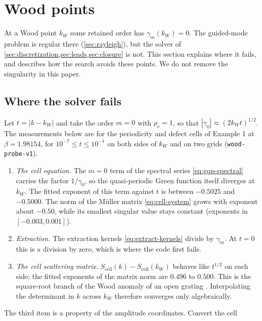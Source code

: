 \section{Wood points}\label{sec:wood}
At a Wood point $k_W$ some retained order has $\gamma_m(k_W)=0$. The
guided-mode problem is regular there (\cref{sec:rayleigh}), but the solver of
\cref{sec:discretization,sec:leads,sec:closure} is not. This section
explains where it fails, and describes how the search avoids these points.
We do not remove the singularity in this paper.

\subsection{Where the solver fails}\label{sec:wood-mechanism}
Let $t=|k-k_W|$ and take the order $m=0$ with $\rho_{\mathrm e}=1$, so that
$|\gamma_0|\approx(2k_Wt)^{1/2}$. The measurements below are for the periodicity
and defect cells of Example 1 at $\beta=1.98154$, for $10^{-7}\le t\le10^{-1}$ on
both sides of $k_W$ and on two grids (\texttt{wood-probe-v1}).
\begin{enumerate}
\item \emph{The cell equation.} The $m=0$ term of the spectral series
  \eqref{eq:gqp-spectral} carries the factor $1/\gamma_0$, so the
  quasi-periodic Green function itself diverges at $k_W$. The fitted exponent
  of this term against $t$ is between $-0.5025$ and $-0.5000$. The norm of
  the Müller matrix \eqref{eq:cell-system} grows with exponent about $-0.50$,
  while its smallest singular value stays constant (exponents in
  $[-0.003,0.001]$).
\item \emph{Extraction.} The extraction kernels \eqref{eq:extract-kernels}
  divide by $\gamma_m$. At $t=0$ this is a division by zero, which is where
  the code first fails.
\item \emph{The cell scattering matrix.} $S_{\mathrm{cell}}(k)-S_{\mathrm{cell}}(k_W)$
  behaves like $t^{1/2}$ on each side; the fitted exponents of the matrix
  norm are $0.496$ to $0.500$. This is the square-root branch of the Wood
  anomaly of an open grating \cite{HesselOliner1965,WojcikWangOrensteinFan2021}.
  Interpolating the determinant in $k$ across $k_W$ therefore converges only
  algebraically.
\end{enumerate}
The third item is a property of the amplitude coordinates. Convert the cell

